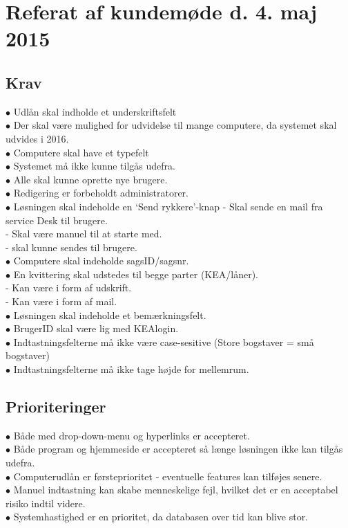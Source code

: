 \documentclass[a4paper]{article}
\begin{document}
\section{Referat af kundemøde d. 4. maj 2015}
\subsection*{Krav}
$\bullet$ Udlån skal indholde et underskriftsfelt \\
$\bullet$ Der skal være mulighed for udvidelse til mange computere, da systemet skal udvides i 2016. \\
$\bullet$ Computere skal have et typefelt\\
$\bullet$ Systemet må ikke kunne tilgås udefra. \\
$\bullet$ Alle skal kunne oprette nye brugere. \\
$\bullet$ Redigering er forbeholdt administratorer. \\
$\bullet$ Løsningen skal indeholde en ‘Send rykkere’-knap - Skal sende en mail fra service Desk til brugere. \\
\indent - Skal være manuel til at starte med. \\
\indent - skal kunne sendes til brugere. \\
$\bullet$ Computere skal indeholde sagsID/sagsnr. \\
$\bullet$ En kvittering skal udstedes til begge parter (KEA/låner).\\
\indent - Kan være i form af udskrift. \\
\indent - Kan være i form af mail. \\
$\bullet$ Løsningen skal indeholde et bemærkningsfelt. \\
$\bullet$ BrugerID skal være lig med KEAlogin. \\
$\bullet$ Indtastningsfelterne må ikke være case-sesitive (Store bogstaver = små bogstaver)\\
$\bullet$ Indtastningsfelterne må ikke tage højde for mellemrum.
\subsection*{Prioriteringer}
$\bullet$ Både med drop-down-menu og hyperlinks er accepteret. \\
$\bullet$ Både program og hjemmeside er accepteret så længe løsningen ikke kan tilgås udefra. \\
$\bullet$ Computerudlån er førsteprioritet - eventuelle features kan tilføjes senere. \\
$\bullet$ Manuel indtastning kan skabe menneskelige fejl, hvilket det er en acceptabel risiko indtil videre. \\
$\bullet$ Systemhastighed er en prioritet, da databasen over tid kan blive stor.
\end{document}
